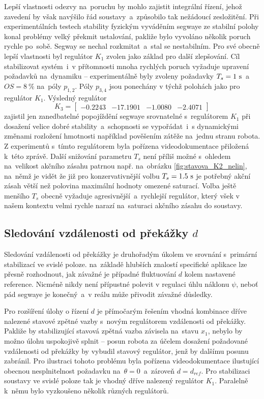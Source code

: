 \documentclass[conference]{IEEEtran}
\begin{document}
Lepší vlastnosti odezvy na~poruchu by mohlo zajistit integrální řízení, jehož zavedení by však navýšilo řád soustavy~a~způsobilo tak nežádoucí zesložitění.
Při experimentálních testech stability fyzickým vyváděním segwaye ze stabilní polohy konal problémy velký překmit ustalování, pakliže bylo vyvoláno
několik poruch rychle po~sobě. Segway se nechal rozkmitat~a~stal se nestabilním. Pro své obecně lepší vlastnosti byl regulátor $K_1$ zvolen jako základ
pro další zlepšování. Cíl stabilizovat systém~i~v přítomnosti mnoha rychlých poruch vyžaduje upravení požadavků na~dynamiku -- experimentálně byly zvoleny
požadavky $T_s = 1~\text{\si{\second}}$~a~$OS = 8~\%$ na~póly $p_{1,2}$. Póly $p_{3,4}$ jsou ponechány v týchž polohách jako pro regulátor $K_1$.
Výsledný regulátor
\begin{equation*}
    K_3 = \begin{bmatrix}
        -0.2243 & -17.1901 &  -1.0080 &  -2.4071
    \end{bmatrix}
\end{equation*}
zajistil jen zanedbatelné popojíždění segwaye srovnatelné s~regulátorem $K_1$ při dosažení velice dobré stability~a~schopnosti se vypořádat~i~s dynamickými změnami rozložení
hmotnosti například pověšením zátěže na~jednu stranu robota. Z experimentů s~tímto regulátorem byla pořízena videodokumentace přiložená k~této zprávě.
Další snižování parametru $T_s$ není příliš možné s~ohledem na~velikost akčního zásahu patrnou např. na~obrázku \ref{fig:stavova_K2_nelin}, na~němž je vidět že již pro
konzervativnější volbu $T_s = 1.5~\text{\si{\second}}$ je potřebný akční zásah větší než polovina maximální hodnoty omezené saturací.   
Volba ještě menšího $T_s$ obecně vyžaduje agresivnější~a~rychlejší regulátor, který všek v našem kontextu velmi rychle narazí na~saturaci akčního zásahu do soustavy.

\subsection{Sledování vzdálenosti od překážky $d$}

Sledování vzdálenosti od překážky je druhořadým úkolem ve srovnání s~primární stabilizací ve svislé poloze. na~základě hlubších znalostí specifické aplikace 
lze přesně rozhodnout, jak závažné je případné fluktuování $d$ kolem nastavené reference. Nicméně nikdy není přípustné polevit v regulaci
úhlu náklonu $\psi$, neboť pád segwaye je konečný~a~v reálu může přivodit závažné důsledky.

Pro rozšíření úlohy o řízení $d$ je přímočarým řešením vhodná kombinace dříve nalezené stavové zpětné vazby s~novým regulátorem 
vzdálenosti od překážky. Pakliže by stabilizující stavová zpětná vazba závisela
na~stavu $x_1$, nebylo by možno úlohu uspokojivě splnit -- posun robota za účelem dosažení požadované vzdálenosti od překážky
by vybudil stavový regulátor, jenž by dalšímu posunu zabránil. Pro ilustraci tohoto problému byla pořízena videodokumentace ilustující obecnou nesplnitelnost
požadavku na~$\theta = 0$~a~zároveň $d = d_{ref}$.
Pro stabilizaci soustavy ve svislé poloze tak je vhodný dříve nalezený regulátor $K_1$. Paralelně k~němu bylo vyzkoušeno několik různých regulátorů.
\end{document}
